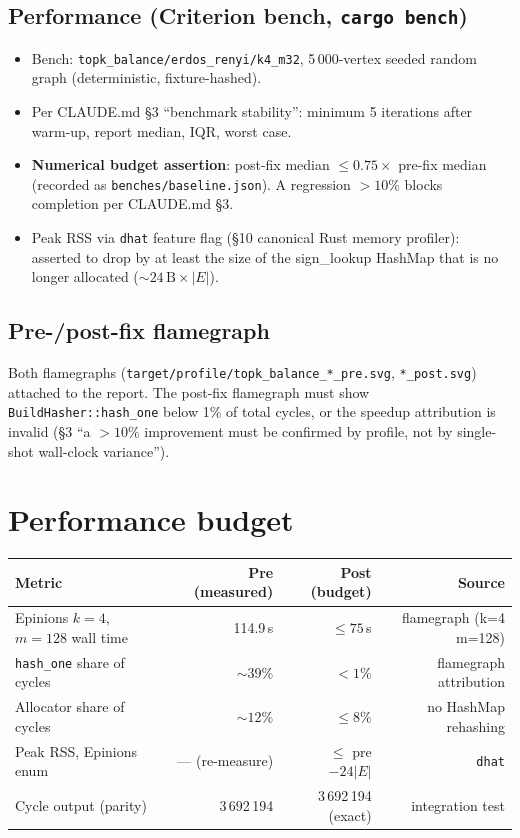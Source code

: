 \documentclass[a4paper,11pt]{article}
\begin{document}
\subsection*{Performance (Criterion bench, \texttt{cargo bench})}

\begin{itemize}
  \item Bench: \texttt{topk\_balance/erdos\_renyi/k4\_m32}, 5\,000-vertex
    seeded random graph (deterministic, fixture-hashed).
  \item Per CLAUDE.md \S3 ``benchmark stability'': minimum 5 iterations
    after warm-up, report median, IQR, worst case.
  \item \textbf{Numerical budget assertion}: post-fix median $\le 0.75
    \times$ pre-fix median (recorded as
    \texttt{benches/baseline.json}). A regression $> 10\%$ blocks
    completion per CLAUDE.md \S3.
  \item Peak RSS via \texttt{dhat} feature flag (\S10 canonical Rust
    memory profiler): asserted to drop by at least the size of the
    sign\_lookup HashMap that is no longer allocated
    ($\sim 24\,\text{B} \times |E|$).
\end{itemize}

\subsection*{Pre-/post-fix flamegraph}

Both flamegraphs (\texttt{target/profile/topk\_balance\_*\_pre.svg},
\texttt{*\_post.svg}) attached to the report. The post-fix flamegraph
must show \texttt{BuildHasher::hash\_one} below 1\% of total cycles, or
the speedup attribution is invalid (\S3 ``a $> 10\%$ improvement must
be confirmed by profile, not by single-shot wall-clock variance'').

\section*{Performance budget}

\begin{center}
\begin{tabular}{lrrr}
\toprule
Metric & Pre (measured) & Post (budget) & Source \\
\midrule
Epinions $k{=}4$, $m{=}128$ wall time & 114.9\,s & $\le 75$\,s & flamegraph (k=4 m=128) \\
\texttt{hash\_one} share of cycles & $\sim 39\%$ & $< 1\%$ & flamegraph attribution \\
Allocator share of cycles & $\sim 12\%$ & $\le 8\%$ & no HashMap rehashing \\
Peak RSS, Epinions enum & --- (re-measure) & $\le$ pre $- 24 |E|$ & \texttt{dhat} \\
Cycle output (parity) & 3\,692\,194 & 3\,692\,194 (exact) & integration test \\
\bottomrule
\end{tabular}
\end{center}
\end{document}
